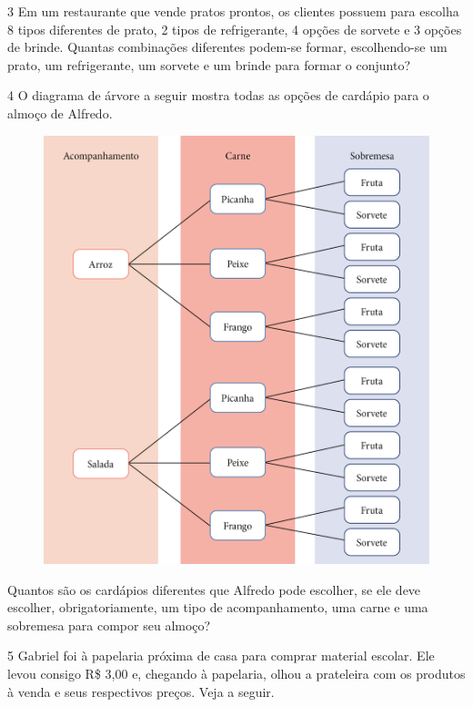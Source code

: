 
\num{3} Em um restaurante que vende pratos prontos, os clientes possuem para
escolha 8 tipos diferentes de prato, 2 tipos de refrigerante, 4 opções
de sorvete e 3 opções de brinde. Quantas combinações diferentes podem-se
formar, escolhendo-se um prato, um refrigerante, um sorvete e um brinde para
formar o conjunto?

\pagebreak

\num{4} O diagrama de árvore a seguir mostra todas as opções de cardápio para o
almoço de Alfredo.

\begin{figure}[htpb!]
\centering
\includegraphics[width=.8\textwidth]{media/image73.png}
\end{figure}

Quantos são os cardápios diferentes que Alfredo pode escolher, se
ele deve escolher, obrigatoriamente, um tipo de acompanhamento, uma
carne e uma sobremesa para compor seu almoço?


\num{5} Gabriel foi à papelaria próxima de casa para comprar material
escolar. Ele levou consigo R\$ 3,00 e, chegando à papelaria, olhou a
prateleira com os produtos à venda e seus respectivos preços. Veja a seguir.

